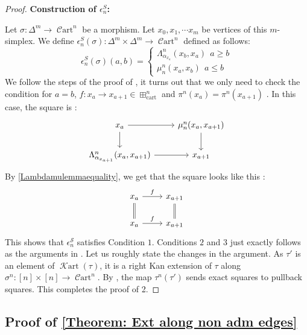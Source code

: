 \documentclass[14pt]{article}
\theoremstyle{definition}
\newcommand{\K}{\mathcal{K}}
\newcommand{\op}[1]{\operatorname{#1}}
\renewcommand{\S}{\mathcal{S}}
\newcommand{\C}{\mathcal{C}}
\numberwithin{subsection}{section}
\newcommand{\Cart}{\op{\C art}}
\newcommand{\Krt}{\op{\K art}}
\begin{document}
\begin{proof}
    \textbf{Construction of $\epsilon_n^S$:\\}

    Let $\sigma: \Delta^m \to \Cart^n$ be a morphism. Let $x_0,x_1,\cdots x_m$ be vertices of this $m$-simplex. We define $\epsilon^S_n(\sigma): \Delta^m \times \Delta^m \to \Cart^n$ defined as follows:
    \begin{equation}
        \epsilon^S_n(\sigma)(a,b) = \begin{cases}
            \Lambda^n_{\alpha_{x_a}}(x_b,x_a) ~~ a\ge b\\
            \mu^n_n(x_a,x_b) ~~ a \le b
        \end{cases}
    \end{equation}
  We follow the steps of the proof of  \cite[Claim 5.5.2]{chowdhury2025sixfunctorformalismsii}, it turns out that we only need to check the condition for $a=b$, $f:x_a \to x_{a+1} \in \boxplus^n_{\op{cart}}$ and $\pi^n(x_a)=\pi^n(x_{a+1})$ . In this case, the square is :
  \begin{equation}
      \begin{tikzcd}
        x_a \arrow[r] \arrow[d] & \mu^n_n(x_a,x_{a+1}) \arrow[d]\\
        \Lambda^n_{\alpha_{x_{a+1}}}(x_a,x_{a+1}) \arrow[r] & x_{a+1}
      \end{tikzcd}
  \end{equation}
  By \cref{Lambdamulemmaequality}, we get that the square looks like this :
  \begin{equation}
       \begin{tikzcd}
          x_a \arrow[d,equal] \arrow[r,"f"] & x_{a+1} \arrow[d,equal] \\
        x_a \arrow[r,"f"] & x_{a+1}
            \end{tikzcd}
  \end{equation}
This shows that $\epsilon^{\S}_n$ satisfies Condition $1$. Conditions $2$ and $3$ just exactly follows as the arguments in \cite{chowdhury2025sixfunctorformalismsii}. Let us roughly state the changes in the argument. As $\tau'$ is an element of $\Krt(\tau)$, it is a right Kan extension of $\tau$ along $\sigma^n : [n] \times [n] \to \Cart^n$.  By \cite[Lemma 5.1.4]{chowdhury2025sixfunctorformalismsii}, the map $\tau^n(\tau')$ sends exact squares to pullback squares. This completes the proof of 2.

\end{proof}


\subsection{Proof of \cref{Theorem: Ext along non adm edges}}
\end{document}
